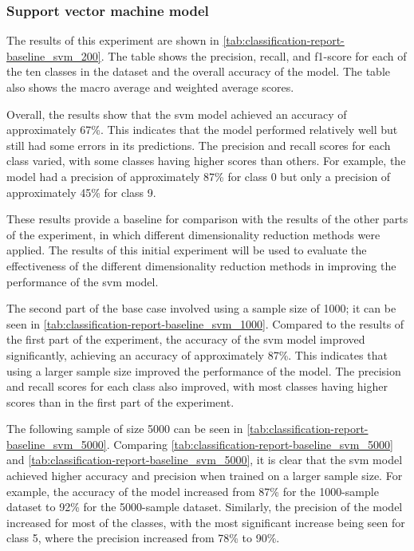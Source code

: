 \subsubsection{Support vector machine model}\label{subsubsec:experiment_4_no_dimmensionality_reduction}






The results of this experiment are shown in \autoref{tab:classification-report-baseline_svm_200}. The table shows the precision, recall, and f1-score for each of the ten classes in the dataset and the overall accuracy of the model. The table also shows the macro average and weighted average scores.

Overall, the results show that the \gls{svm} model achieved an accuracy of approximately 67\%. This indicates that the model performed relatively well but still had some errors in its predictions. The precision and recall scores for each class varied, with some classes having higher scores than others. For example, the model had a precision of approximately 87\% for class 0 but only a precision of approximately 45\% for class 9.

These results provide a baseline for comparison with the results of the other parts of the experiment, in which different dimensionality reduction methods were applied. The results of this initial experiment will be used to evaluate the effectiveness of the different dimensionality reduction methods in improving the performance of the \gls{svm} model.

The second part of the base case involved using a sample size of 1000; it can be seen in \ref{tab:classification-report-baseline_svm_1000}. Compared to the results of the first part of the experiment, the accuracy of the \gls{svm} model improved significantly, achieving an accuracy of approximately 87\%. This indicates that using a larger sample size improved the performance of the model. The precision and recall scores for each class also improved, with most classes having higher scores than in the first part of the experiment.

The following sample of size 5000 can be seen in \autoref{tab:classification-report-baseline_svm_5000}. Comparing \autoref{tab:classification-report-baseline_svm_5000} and \autoref{tab:classification-report-baseline_svm_5000}, it is clear that the \gls{svm} model achieved higher accuracy and precision when trained on a larger sample size. For example, the accuracy of the model increased from 87\% for the 1000-sample dataset to 92\% for the 5000-sample dataset. Similarly, the precision of the model increased for most of the classes, with the most significant increase being seen for class 5, where the precision increased from 78\% to 90\%.

